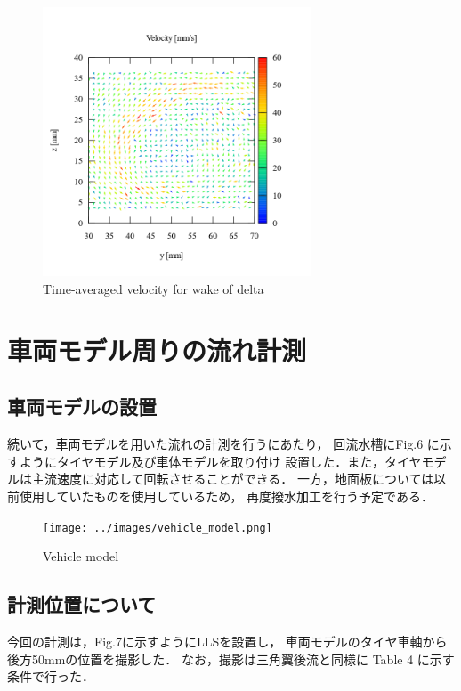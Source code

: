 \documentclass[twocolumn,a4j]{jsarticle}
\begin{document}
\begin{figure}[htbp]
  \footnotesize
  \begin{center}
    \includegraphics[width=80mm]{../images/delta_wing.png}
    \caption{Time-averaged velocity for wake of delta}
  \end{center}
\end{figure}

\newpage

\section{車両モデル周りの流れ計測}

\subsection{車両モデルの設置}
続いて，車両モデルを用いた流れの計測を行うにあたり，
回流水槽にFig.6 に示すようにタイヤモデル及び車体モデルを取り付け
設置した．また，タイヤモデルは主流速度に対応して回転させることができる．
一方，地面板については以前使用していたものを使用しているため，
再度撥水加工を行う予定である．

\begin{figure}[htbp]
  \footnotesize
  \begin{center}
    \texttt{[image: ../images/vehicle\_model.png]}
    \caption{Vehicle model}
  \end{center}
\end{figure}

\subsection*{計測位置について}
今回の計測は，Fig.7に示すようにLLSを設置し，
車両モデルのタイヤ車軸から後方50mmの位置を撮影した．
なお，撮影は三角翼後流と同様に
Table 4 に示す条件で行った．
\end{document}
